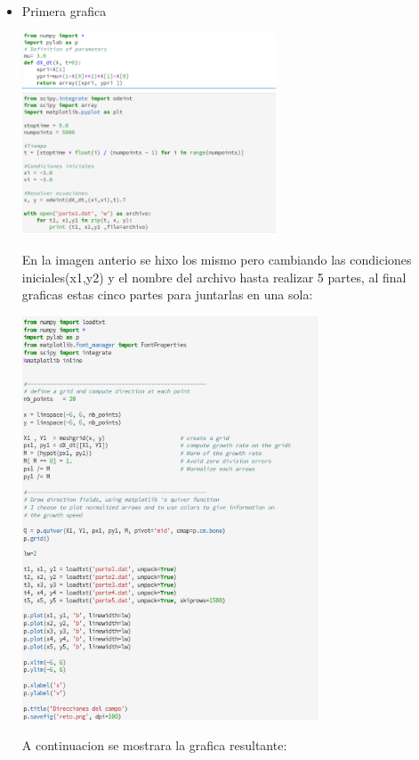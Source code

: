 \documentclass{article}
\begin{document}
\begin{itemize}
\item Primera grafica


\begin{center}
\includegraphics[height=6cm]{cod1.png}
\end{center}

En la imagen anterio se hixo los mismo pero cambiando las condiciones iniciales(x1,y2) y el nombre del archivo hasta realizar 5 partes, al final
 graficas estas cinco partes para juntarlas en una sola:
 
 
\begin{center}
\includegraphics[height=12cm]{cod2.png}
\end{center}

A continuacion se mostrara la grafica resultante:


\end{itemize}
\end{document}
